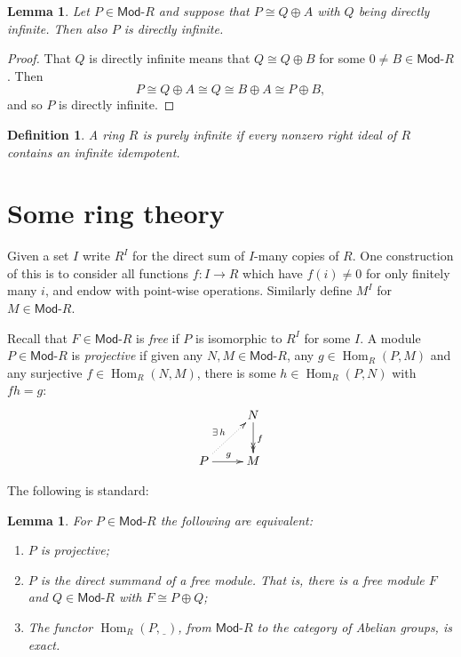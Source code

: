 \documentclass[a4paper,12pt]{article}
\theoremstyle{plain}
\newtheorem{lemma}[proposition]{Lemma}
\newtheorem{definition}[proposition]{Definition}
\theoremstyle{definition}
\renewcommand{\mod}{\textsf{Mod-}}
\renewcommand{\hom}{\operatorname{Hom}}
\newcommand{\unkn}{\underline{\ \ }}
\begin{document}
\begin{lemma}\label{lem:3}
Let $P\in\mod R$ and suppose that $P\cong Q\oplus A$ with $Q$ being directly infinite.  Then also $P$
is directly infinite.
\end{lemma}
\begin{proof}
That $Q$ is directly infinite means that $Q\cong Q\oplus B$ for some $0 \not= B\in\mod R$. Then
\[ P \cong    Q\oplus A \cong    Q\cong B\oplus A \cong    P \oplus B, \]
and so $P$ is directly infinite.
\end{proof}

\begin{definition}
A ring $R$ is \emph{purely infinite} if every nonzero right ideal of $R$ contains an infinite idempotent.
\end{definition}



\section{Some ring theory}

Given a set $I$ write $R^I$ for the direct sum of $I$-many copies of $R$.  One construction of this
is to consider all functions $f:I\rightarrow R$ which have $f(i)\not=0$ for only finitely many $i$, and endow
with point-wise operations.  Similarly define $M^I$ for $M\in\mod R$.

Recall that $F\in\mod R$ is \emph{free} if $P$ is isomorphic to $R^I$ for some $I$.  A module $P\in\mod R$ is
\emph{projective} if given any $N,M\in\mod R$, any $g\in\hom_R(P,M)$ and any surjective $f\in\hom_R(N,M)$,
there is some $h\in\hom_R(P,N)$ with $fh=g$:
\[ \xymatrix{ &  N \ar@{->>}[d]^f \\
P \ar@{..>}[ru]^{\exists\, h} \ar[r]^g &
M } \]

The following is standard:

\begin{lemma}
For $P\in\mod R$ the following are equivalent:
\begin{enumerate}
\item $P$ is projective;
\item $P$ is the direct summand of a free module.  That is, there is a free module $F$ and $Q\in\mod R$ with
$F \cong P\oplus Q$;
\item The functor $\hom_R(P,\unkn)$, from $\mod R$ to the category of Abelian groups, is exact.
\end{enumerate}
\end{lemma}
\end{document}
